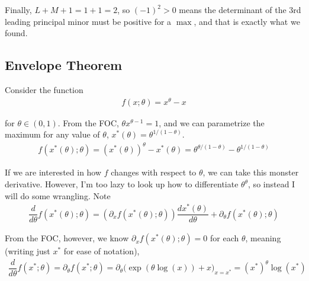 \documentclass{article}
\begin{document}
Finally, $L + M + 1 = 1 + 1 = 2$, so $(-1)^2 > 0$ means the determinant of the  3rd leading principal minor must be positive for a $\max$, and that is exactly what we found.

\subsection{Envelope Theorem}
\label{sub:envelope_theorem}

Consider the function
\begin{align*}
  f(x; \theta) = x^\theta - x
\end{align*}

for $\theta \in (0, 1)$. From the FOC, $\theta x^{\theta - 1} = 1$, and we can parametrize the maximum for any value of $\theta$, $x^*(\theta) = \theta^{1/(1 - \theta)}$.
\begin{align*}
  f(x^*(\theta); \theta)
  =
  (x^*(\theta))^\theta - x^*(\theta)
  =
  \theta^{\theta /(1 - \theta)}
  -
  \theta^{1 /(1 - \theta)}
\end{align*}

If we are interested in how $f$ changes with respect to $\theta$, we can take this monster derivative. However, I'm too lazy to look up how to differentiate $\theta^\theta$, so instead I will do some wrangling. Note
\begin{align*}
  \dfrac{d}{d\theta}
  f(x^*(\theta); \theta)
  =
  \left(
    \partial_x f(x^*(\theta); \theta)
  \right) \dfrac{d x^*(\theta)}{d \theta}
  +
  \partial_{\theta} f(x^*(\theta); \theta)
\end{align*}

From the FOC, however, we know $\partial_x f(x^*(\theta); \theta) = 0$ for each $\theta$, meaning (writing just $x^*$ for ease of notation),
\begin{align*}
  \dfrac{d}{d\theta} f(x^*; \theta)
  =
  \partial_{\theta} f(x^*; \theta)
  =
  \partial_{\theta}
  \Big(
    \exp(\theta \log(x))
    +
    x
  \Big)_{x = x^*}
  =
  (x^*)^\theta \log(x^*)
\end{align*}
\end{document}
